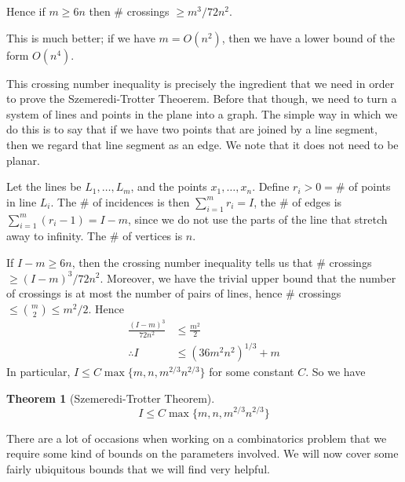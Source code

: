 \documentclass[]{article}
\theoremstyle{custhm}
\newtheorem{theorem}{Theorem}[section]
\theoremstyle{cusdef}
\theoremstyle{custhm}
\theoremstyle{custhm}
\theoremstyle{custhm}
\theoremstyle{custhm}
\theoremstyle{cusdef}
\theoremstyle{remark}
\begin{document}
Hence if $m \ge 6n$ then $\#$ crossings $\ge m^3/72n^2$.

This is much better; if we have $m = O(n^2)$, then we have a lower bound of the form $O(n^4)$.

This crossing number inequality is precisely the ingredient that we need in order to prove the Szemeredi-Trotter Theoerem. Before that though, we need to turn a system of lines and points in the plane into a graph. The simple way in which we do this is to say that if we have two points that are joined by a line segment, then we regard that line segment as an edge. We note that it does not need to be planar.

Let the lines be $L_1,\dots,L_m$, and the points $x_1,\dots,x_n$. Define $r_i>0 = \#$ of points in line $L_i$. The $\#$ of incidences is then $\sum_{i=1}^{m}r_i = I$, the $\#$ of edges is $\sum_{i=1}^{m}(r_i - 1) = I - m$, since we do not use the parts of the line that stretch away to infinity. The $\#$ of vertices is $n$.

If $I - m \ge 6n$, then the crossing number inequality tells us that $\#$ crossings $\ge (I-m)^3/72n^2$. Moreover, we have the trivial upper bound that the number of crossings is at most the number of pairs of lines, hence $\#$ crossings $\le \binom{m}{2}\le m^2/2$. Hence
\begin{align*}
\frac{(I-m)^3}{72n^2} &\le \frac{m^2}{2}\\
\therefore I &\le (36m^2n^2)^{1/3} + m
\end{align*}
In particular, $I \le C\max\{m,n,m^{2/3}n^{2/3}\}$ for some constant $C$. So we have

\begin{theorem}[Szemeredi-Trotter Theorem]
	\[
	I\le C\max\{m,n,m^{2/3}n^{2/3}\}
	\]
\end{theorem}

There are a lot of occasions when working on a combinatorics problem that we require some kind of bounds on the parameters involved. We will now cover some fairly ubiquitous bounds that we will find very helpful.
\end{document}
